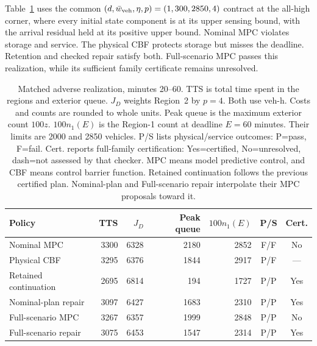\documentclass[preprint,12pt]{elsarticle}
\begin{document}
Table~\ref{tab:benchmark-conflict} uses the common
$(d,\bar w_{\rm veh},\eta,p)=(1,300,2850,4)$ contract at the all-high
corner, where every initial state component is at its upper sensing bound,
with the arrival residual held at its positive upper bound. Nominal MPC violates storage and service.
The physical CBF protects storage but misses the deadline. Retention and
checked repair satisfy both. Full-scenario MPC passes this realization,
while its sufficient family certificate remains unresolved.

\begin{table}[t]
\centering\footnotesize
\caption{Matched adverse realization, minutes 20--60. TTS is total
time spent in the regions and exterior queue. $J_D$ weights Region~2 by
$p=4$. Both use veh-h. Costs and counts are rounded to whole
units. Peak queue is the maximum exterior count $100z$. $100n_1(E)$ is the
Region-1 count at deadline $E=60$ minutes. Their limits are 2000 and 2850
vehicles. P/S lists physical/service outcomes: P=pass, F=fail. Cert.
reports full-family certification: Yes=certified, No=unresolved,
dash=not assessed by that checker.
MPC means model predictive control, and CBF means control barrier function.
Retained continuation follows the previous certified plan. Nominal-plan
and Full-scenario repair interpolate their MPC proposals toward it.}
\label{tab:benchmark-conflict}
\setlength{\tabcolsep}{3pt}
\begin{tabular}{@{}lrrrrcc@{}}
\toprule
Policy & TTS & $J_D$ & Peak queue & $100n_1(E)$ & P/S & Cert.\\
\midrule
Nominal MPC & 3300 & 6328 & 2180 & 2852 & F/F & No\\
Physical CBF & 3295 & 6376 & 1844 & 2917 & P/F & ---\\
Retained continuation & 2695 & 6814 & 194 & 1727 & P/P & Yes\\
Nominal-plan repair & 3097 & 6427 & 1683 & 2310 & P/P & Yes\\
Full-scenario MPC & 3267 & 6357 & 1999 & 2848 & P/P & No\\
Full-scenario repair & 3075 & 6453 & 1547 & 2314 & P/P & Yes\\
\bottomrule
\end{tabular}
\end{table}
\end{document}
